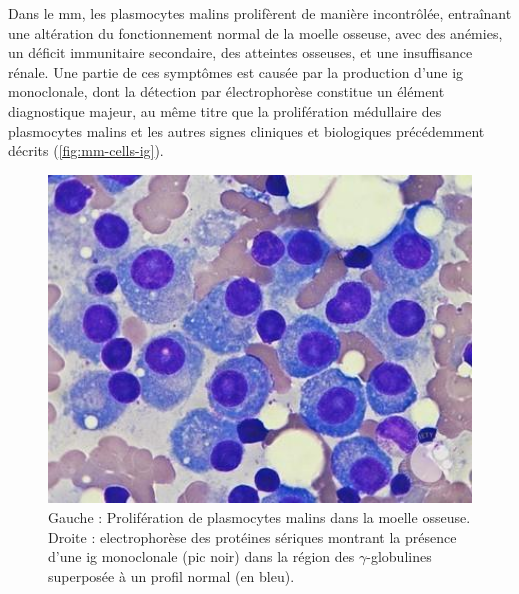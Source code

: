 Dans le \gls{mm}, les plasmocytes malins prolifèrent de manière incontrôlée,
entraînant une altération du fonctionnement normal de la moelle osseuse, avec
des anémies, un déficit immunitaire secondaire, des atteintes osseuses, et une
insuffisance rénale. Une partie de ces symptômes est causée par la production
d'une \gls{ig} monoclonale, dont la détection par électrophorèse constitue un
élément diagnostique majeur, au même titre que la prolifération médullaire des
plasmocytes malins et les autres signes cliniques et biologiques précédemment
décrits \cite{cowanDiagnosisManagementMultiple2022a}
(\autoref{fig:mm-cells-ig}).

\begin{figure}[H]
    \begin{minipage}{0.40\textwidth}
        \centering
        \includegraphics[width=1\textwidth]{images/mm_cells.jpeg}
    \end{minipage}
    \hspace{0.05\textwidth} 
    \begin{minipage}{0.50\textwidth}
        \centering
        
    \end{minipage}
    \caption{Gauche : Prolifération de plasmocytes malins dans la moelle osseuse.
        Droite : electrophorèse des protéines sériques montrant la présence d'une 
        \colorbox{black!20}{\gls{ig} monoclonale (pic noir)} dans la région des $\gamma$-globulines 
        superposée à un \colorbox{blue!20}{profil normal (en bleu)}.}
    \label{fig:mm-cells-ig}
\end{figure}

